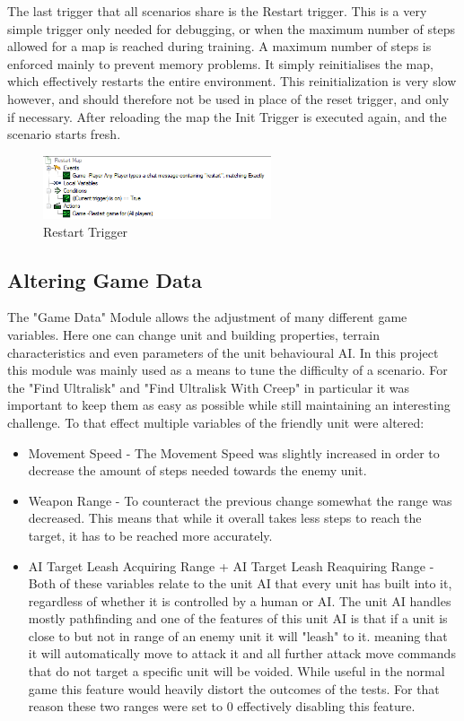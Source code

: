 The last trigger that all scenarios share is the Restart trigger. This is a very simple trigger only needed for debugging, or when the maximum number of steps allowed for a map is reached during training. A maximum number of steps is enforced mainly to prevent memory problems.
It simply reinitialises the map, which effectively restarts the entire environment. 
This reinitialization is very slow however, and should therefore not be used in place of the reset trigger, and only if necessary.
After reloading the map the Init Trigger is executed again, and the scenario starts fresh.

\begin{figure}[htb]
  \centering
      \includegraphics[width=0.6\textwidth]{Figures/Triggers/trigger_reset_full.png}
  \caption{ Restart Trigger }
\end{figure}



\subsection{Altering Game Data}
The "Game Data" Module allows the adjustment of many different game variables. Here one can change unit and building properties, terrain characteristics and even parameters of the unit behavioural AI. In this project this module was mainly used as a means to tune the difficulty of a scenario. For the "Find Ultralisk" and "Find Ultralisk With Creep" in particular it was important to keep them as easy as possible while still maintaining an interesting challenge.
To that effect multiple variables of the friendly unit were altered:
\begin{itemize}
\item Movement Speed - The Movement Speed was slightly increased in order to decrease the amount of steps needed towards the enemy unit.
\item Weapon Range - To counteract the previous change somewhat the range was decreased. This means that while it overall takes less steps to reach the target, it has to be reached more accurately.
\item AI Target Leash Acquiring Range + AI Target Leash Reaquiring Range - Both of these variables relate to the unit AI that every unit has built into it, regardless of whether it is controlled by a human or AI. The unit AI handles mostly pathfinding and one of the features of this unit AI is that if a unit is close to but not in range of an enemy unit it will "leash" to it. meaning that it will automatically move to attack it and all further attack move commands that do not target a specific unit will be voided. While useful in the normal game this feature would heavily distort the outcomes of the tests. For that reason these two ranges were set to 0 effectively disabling this feature.
\end{itemize}

